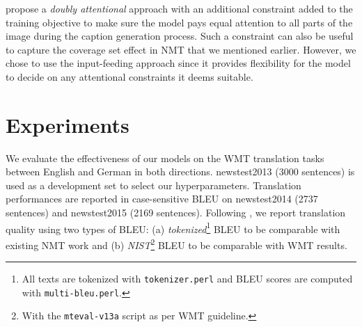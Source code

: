 \documentclass[11pt,a4paper]{article}
\newcommand{\edit}[1]{{#1}} \newcommand{\hide}[1]{}
\begin{document}
 propose a {\it doubly attentional} approach with an
additional constraint added to the training objective to make sure the model
pays equal attention to all parts of the image during the caption generation process. Such a constraint can also be useful to capture the coverage set effect in NMT that we mentioned earlier. However, we chose to use the input-feeding approach since it provides flexibility for the model to decide on any attentional constraints it deems suitable.











 

\section{Experiments}
\label{sec:exp}
We evaluate the effectiveness of our models on the WMT translation tasks between
English and German in both directions. newstest2013 (3000 sentences) is used as
a development set to select our hyperparameters. Translation performances are
reported in case-sensitive BLEU \cite{Papineni02bleu} on newstest2014 (2737 sentences) and
newstest2015 (2169 sentences). \edit{Following \cite{luong15}, we report
translation quality using two types of BLEU: (a) {\it
tokenized}\footnote{All texts are tokenized with \texttt{tokenizer.perl} and BLEU
scores are computed with \texttt{multi-bleu.perl}.} BLEU to be comparable with
existing NMT work and (b) {\it NIST}\footnote{With the \texttt{mteval-v13a}
script as per WMT guideline.} BLEU to be comparable
with WMT results.}
\end{document}
